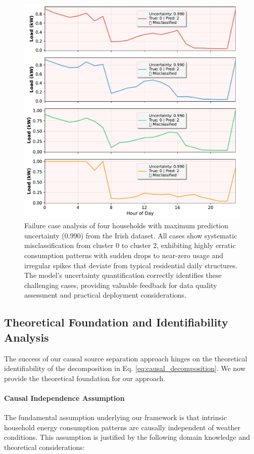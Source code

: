 \documentclass[journal]{IEEEtran}
\begin{document}
\begin{figure}[t!]
\centering
\includegraphics[width=1\columnwidth]{images/failure_case_analysis.pdf}
\caption{Failure case analysis of four households with maximum prediction uncertainty (0.990) from the Irish dataset. All cases show systematic misclassification from cluster 0 to cluster 2, exhibiting highly erratic consumption patterns with sudden drops to near-zero usage and irregular spikes that deviate from typical residential daily structures. The model's uncertainty quantification correctly identifies these challenging cases, providing valuable feedback for data quality assessment and practical deployment considerations.}
\label{fig:failure_case}
\end{figure}

\subsection{Theoretical Foundation and Identifiability Analysis}
The success of our causal source separation approach hinges on the theoretical identifiability of the decomposition in Eq. \ref{eq:causal_decomposition}. We now provide the theoretical foundation for our approach.

\paragraph{Causal Independence Assumption}
The fundamental assumption underlying our framework is that intrinsic household energy consumption patterns are causally independent of weather conditions. This assumption is justified by the following domain knowledge and theoretical considerations:
\end{document}
